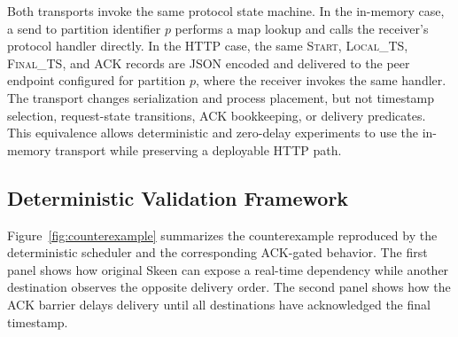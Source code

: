 \documentclass[conference]{IEEEtran}
\begin{document}
Both transports invoke the same protocol state machine. In the in-memory case, a send to partition identifier $p$ performs a map lookup and calls the receiver's protocol handler directly. In the HTTP case, the same \textsc{Start}, \textsc{Local\_TS}, \textsc{Final\_TS}, and \textsc{ACK} records are JSON encoded and delivered to the peer endpoint configured for partition $p$, where the receiver invokes the same handler. The transport changes serialization and process placement, but not timestamp selection, request-state transitions, ACK bookkeeping, or delivery predicates. This equivalence allows deterministic and zero-delay experiments to use the in-memory transport while preserving a deployable HTTP path.

\subsection{Deterministic Validation Framework}

Figure~\ref{fig:counterexample} summarizes the counterexample reproduced by the deterministic scheduler and the corresponding ACK-gated behavior. The first panel shows how original Skeen can expose a real-time dependency while another destination observes the opposite delivery order. The second panel shows how the ACK barrier delays delivery until all destinations have acknowledged the final timestamp.
\end{document}
